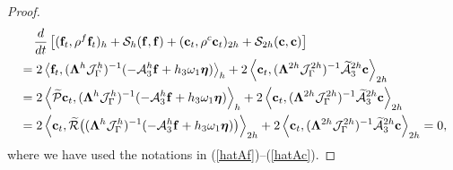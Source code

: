 \begin{proof}
\begin{align*}
&\hspace{0.4cm}\frac{d}{dt}\left[({\bf f}_t,\rho^f {\bf f}_t)_{h} + \mathcal{S}_{h}({\bf f},{\bf f}) + ({\bf c}_t,\rho^{c} {\bf c}_t)_{2h} + \mathcal{S}_{2h}({\bf c},{\bf c}) \right]   \nonumber\\
& = 2\left<{\bf f}_t,(\bm{\Lambda}^{h}\mathcal{J}^h_\Gamma)^{-1}(-\mathcal{A}_3^h{\bf f}+h_3\omega_1{\bm \eta})\right>_{h}+ 2\left<{\bf c}_t,(\bm{\Lambda}^{2h}\mathcal{J}^{2h}_\Gamma)^{-1}\widetilde{\mathcal{A}}_3^{2h}{\bf c}\right>_{2h} \nonumber\\
& = 2\left<\widetilde{\mathcal{P}}{\bf c}_t,(\bm{\Lambda}^{h}\mathcal{J}^h_\Gamma)^{-1}(-\mathcal{A}_3^h{\bf f}+h_3\omega_1{\bm \eta})\right>_{h}+ 2\left<{\bf c}_t, (\bm{\Lambda}^{2h}\mathcal{J}^{2h}_\Gamma)^{-1}\widetilde{\mathcal{A}}_3^{2h}{\bf c}\right>_{2h} \nonumber\\
& = 2\left<{\bf c}_t,\widetilde{\mathcal{R}}\big((\bm{\Lambda}^{h}\mathcal{J}^h_\Gamma)^{-1}(-\mathcal{A}_3^h{\bf f}+h_3\omega_1{\bm \eta})\big)\right>_{2h}+ 2\left<{\bf c}_t,(\bm{\Lambda}^{2h}\mathcal{J}^{2h}_\Gamma)^{-1}\widetilde{\mathcal{A}}_3^{2h}{\bf c}\right>_{2h} = 0,
\end{align*}
where we have used the notations in (\ref{hatAf})--(\ref{hatAc}).
\end{proof}